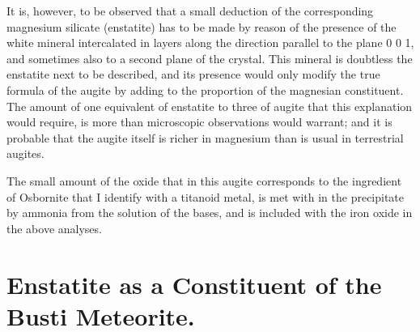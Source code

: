 \documentclass[a4paper, 12pt, oneside]{article}
\begin{document}
It is, however, to be observed that a small deduction of the corresponding magnesium silicate (enstatite) has to be made by reason of the presence of the white mineral intercalated in layers along the direction parallel to the plane 0 0 1, and sometimes also to a second plane of the crystal. This mineral is doubtless the enstatite next to be described, and its presence would only modify the true formula of the augite by adding to the proportion of the magnesian constituent. The amount of one equivalent of enstatite to three of augite that this explanation would require, is more than microscopic observations would warrant; and it is probable that the augite itself is richer in magnesium than is usual in terrestrial augites.

The small amount of the oxide that in this augite corresponds to the ingredient of Osbornite that I identify with a titanoid metal, is met with in the precipitate by ammonia from the solution of the bases, and is included with the iron oxide in the above analyses.
\clearpage
\section{Enstatite as a Constituent of the Busti Meteorite.}
\end{document}
